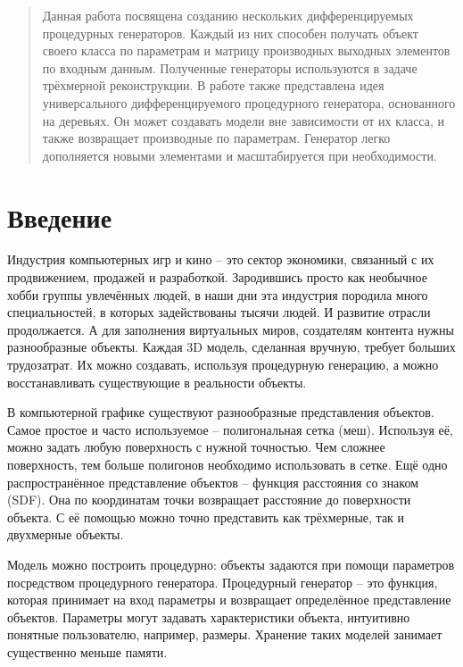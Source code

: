 \documentclass[a4paper,hidelinks,12pt]{article}
\begin{document}
\begin{abstract}
Данная работа посвящена созданию нескольких дифференцируемых процедурных генераторов. Каждый из них способен получать объект своего класса по параметрам и матрицу производных выходных элементов по входным данным. Полученные генераторы используются в задаче трёхмерной реконструкции. В работе также представлена идея универсального дифференцируемого процедурного генератора, основанного на деревьях. Он может создавать модели вне зависимости от их класса, и также возвращает производные по параметрам. Генератор легко дополняется новыми элементами и масштабируется при необходимости. 
\end{abstract}

\newpage
\tableofcontents

\newpage
\section{Введение}
Индустрия компьютерных игр и кино – это сектор экономики, связанный с их продвижением, продажей и разработкой. Зародившись просто как необычное хобби группы увлечённых людей, в наши дни эта индустрия породила много специальностей, в которых задействованы тысячи людей. И развитие отрасли продолжается. А для заполнения виртуальных миров, создателям контента нужны разнообразные объекты. Каждая 3D модель, сделанная вручную, требует больших трудозатрат. Их можно создавать, используя процедурную генерацию, а можно восстанавливать существующие в реальности объекты.  
\par
В компьютерной графике существуют разнообразные представления объектов. Самое простое и часто используемое – полигональная сетка (меш). Используя её, можно задать любую поверхность с нужной точностью. Чем сложнее поверхность, тем больше полигонов необходимо использовать в сетке. Ещё одно распространённое представление объектов – функция расстояния со знаком (SDF). Она по координатам точки возвращает расстояние до поверхности объекта. С её помощью можно точно представить как трёхмерные, так и двухмерные объекты.
\par
Модель можно построить процедурно: объекты задаются при помощи параметров посредством процедурного генератора. Процедурный генератор – это функция, которая принимает на вход параметры и возвращает определённое представление объектов. Параметры могут задавать характеристики объекта, интуитивно понятные пользователю, например, размеры. Хранение таких моделей занимает существенно меньше памяти.
\par
\end{document}
